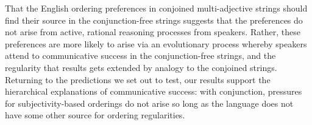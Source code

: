 \documentclass[12pt,letterpaper]{article}
\begin{document}
That the English ordering preferences in conjoined multi-adjective strings should find their source in the conjunction-free strings suggests that the preferences do not arise from active, rational reasoning processes from speakers. Rather, these preferences are more likely to arise via an evolutionary process whereby speakers attend to communicative success in the conjunction-free strings, and the regularity that results gets extended by analogy to the conjoined strings. Returning to the predictions we set out to test, our results support the hierarchical explanations of communicative success: with conjunction, pressures for subjectivity-based orderings do not arise so long as the language does not have some other source for ordering regularities. \\



\setlength{\bibhang}{0.4in}			%
\titleformat{\section}{\normalfont\bfseries}{\thesection}{.5em}{}		%


\newcommand{\doi}[1]{\href{http://dx.doi.org/#1}{http://dx.doi.org/#1}}	%
\end{document}

